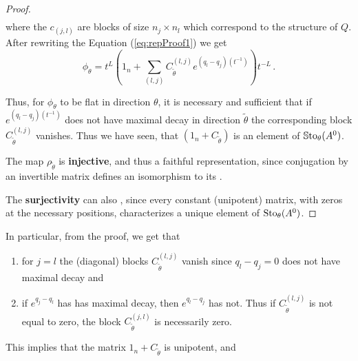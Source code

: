 \begin{proof}
\begin{align*}
  \end{align*}
  where the $c_{(j,l)}$ are blocks of size $n_j\times n_l$ which correspond to the structure of
  $Q$. After rewriting the Equation (\ref{eq:repProof1}) we get
  \[
    \phi_\theta=
      t^L\left(
        1_n+\sum_{(l,j)}C_{\tilde\theta}^{(l,j)}e^{(q_l-q_j)(t^{-1})}
      \right)t^{-L} \,.
  \]
  \begin{comment}
    \begin{align*}
      \phi_\theta(t)
      &=t^Le^{Q(t^{-1})}\left(
        1_n+C_{\tilde\theta}
      \right)e^{-Q(t^{-1})}t^{-L}
    \\&=t^Le^{Q(t^{-1})}\left(
        1_n+\sum_{(l,j)}C_{\tilde\theta}^{(l,j)}
      \right)e^{-Q(t^{-1})}t^{-L}
    \\&=t^L\left(
        1_n+\sum_{(l,j)}e^{Q(t^{-1})}C_{\tilde\theta}^{(l,j)}e^{-Q(t^{-1})}
      \right)t^{-L}
    \\&=t^L\left(
          1_n+\sum_{(l,j)}C_{\tilde\theta}^{(l,j)}e^{(q_l-q_j)(t^{-1})}
        \right)t^{-L} \,.
    \end{align*}
  \end{comment}
  Thus, for $\phi_{\theta}$ to be flat in direction $\theta$, it is
  necessary and sufficient that if $e^{(q_l-q_j)(t^{-1})}$ does not have
  maximal decay in direction $\tilde\theta$ the corresponding
  block $C_{\tilde\theta}^{(l,j)}$ vanishes.
  Thus we have seen, that $(1_n+C_{\tilde\theta})$ is an element of
  $\operatorname{\mathbb{S}to}_\theta(A^0)$.

  The map $\rho_{\tilde\theta}$ is \textbf{injective}, and thus a faithful
  representation, since conjugation by an invertible matrix defines an
  isomorphism to its .

  The \textbf{surjectivity} can also , since every
  constant (unipotent) matrix, with zeros at the necessary positions,
  characterizes a unique element of $\operatorname{Sto}_\theta(A^0)$.
  \TODO[Isomorphic to $\C^{?}$?]
\end{proof}

In particular, from the proof, we get that
\begin{enumerate}
  \item for $j=l$ the (diagonal) blocks $C_{\tilde\theta}^{(l,j)}$ vanish since
    $q_l-q_j=0$ does not have maximal decay and
  \item if $e^{q_j-q_l}$ has has maximal decay, then $e^{q_l-q_j}$ has not.
    Thus if $C_{\tilde\theta}^{(l,j)}$ is not equal to zero, the block
    $C_{\tilde\theta}^{(j,l)}$ is necessarily zero.
\end{enumerate}
\begin{rem}
  This implies that the matrix $1_n+C_{\tilde\theta}$ is unipotent, and
\end{rem}

